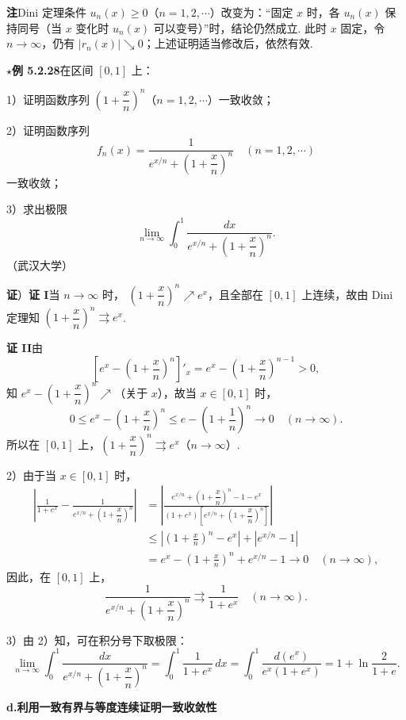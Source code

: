 \documentclass[UTF8, 12pt, fontset=fandol, oneside]{ctexart}
\begin{document}
\noindent\textbf{注}\quad Dini 定理条件 $u_n(x)\ge0$（$n=1,2,\cdots$）改变为：“固定 $x$ 时，各
$u_n(x)$ 保持同号（当 $x$ 变化时 $u_n(x)$ 可以变号）”时，结论仍然成立. 此时 $x$ 固定，令
$n\to\infty$，仍有 $|r_n(x)|\searrow0$；上述证明适当修改后，依然有效.

\noindent\textbf{$\star$例 5.2.28}\quad 在区间 $[0,1]$ 上：

1）证明函数序列 $\left(1+\dfrac{x}{n}\right)^n$（$n=1,2,\cdots$）一致收敛；

2）证明函数序列
\[
  f_n(x)=\frac1{e^{x/n}+\left(1+\dfrac{x}{n}\right)^n}\quad(n=1,2,\cdots)
\]
一致收敛；

3）求出极限
\[
  \lim_{n\to\infty}\int_0^1
  \frac{dx}{e^{x/n}+\left(1+\dfrac{x}{n}\right)^n}.
\]
（武汉大学）

\noindent\textbf{证}）\textbf{证 I}\quad 当 $n\to\infty$ 时，
$\left(1+\dfrac{x}{n}\right)^n\nearrow e^x$，且全部在 $[0,1]$ 上连续，故由 Dini 定理知
$\left(1+\dfrac{x}{n}\right)^n\rightrightarrows e^x$.

\noindent\textbf{证 II}\quad 由
\[
  \left[e^x-\left(1+\frac{x}{n}\right)^n\right]'_x
  =e^x-\left(1+\frac{x}{n}\right)^{n-1}>0,
\]
知 $e^x-\left(1+\dfrac{x}{n}\right)^n\nearrow$（关于 $x$），故当 $x\in[0,1]$ 时，
\[
  0\le e^x-\left(1+\frac{x}{n}\right)^n
  \le e-\left(1+\frac1n\right)^n\to0\quad(n\to\infty).
\]
所以在 $[0,1]$ 上，$\left(1+\dfrac{x}{n}\right)^n\rightrightarrows e^x$（$n\to\infty$）.

2）由于当 $x\in[0,1]$ 时，
\[
\begin{aligned}
  \left|\frac1{1+e^x}
  -\frac1{e^{x/n}+\left(1+\dfrac{x}{n}\right)^n}\right|
  &=
  \left|\frac{e^{x/n}+\left(1+\dfrac{x}{n}\right)^n-1-e^x}
  {(1+e^x)\left[e^{x/n}+\left(1+\dfrac{x}{n}\right)^n\right]}\right|\\
  &\le \left|\left(1+\frac{x}{n}\right)^n-e^x\right|+|e^{x/n}-1|\\
  &=e^x-\left(1+\frac{x}{n}\right)^n+e^{x/n}-1\to0\quad(n\to\infty),
\end{aligned}
\]
因此，在 $[0,1]$ 上，
\[
  \frac1{e^{x/n}+\left(1+\dfrac{x}{n}\right)^n}
  \rightrightarrows\frac1{1+e^x}\quad(n\to\infty).
\]

3）由 2）知，可在积分号下取极限：
\[
  \lim_{n\to\infty}\int_0^1
  \frac{dx}{e^{x/n}+\left(1+\dfrac{x}{n}\right)^n}
  =\int_0^1\frac1{1+e^x}\,dx
  =\int_0^1\frac{d(e^x)}{e^x(1+e^x)}
  =1+\ln\frac2{1+e}.
\]

\noindent\textbf{d.\quad 利用一致有界与等度连续证明一致收敛性}
\end{document}
